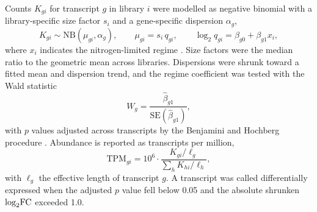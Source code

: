 Counts $K_{gi}$ for transcript $g$ in library $i$ were modelled as negative
binomial with a library-specific size factor $s_i$ and a gene-specific
dispersion $\alpha_g$,
\begin{equation}
  \label{eq:nb}
  K_{gi} \sim \mathrm{NB}\!\left(\mu_{gi}, \alpha_g\right),
  \qquad
  \mu_{gi} = s_i \, q_{gi},
  \qquad
  \log_{2} q_{gi} = \beta_{g0} + \beta_{g1} x_i,
\end{equation}
where $x_i$ indicates the nitrogen-limited regime \citep{love2014deseq2}.
Size factors were the median ratio to the geometric mean across libraries.
Dispersions were shrunk toward a fitted mean and dispersion trend, and the
regime coefficient was tested with the Wald statistic
\begin{equation}
  \label{eq:wald}
  W_g = \frac{\hat{\beta}_{g1}}{\mathrm{SE}(\hat{\beta}_{g1})},
\end{equation}
with $p$ values adjusted across transcripts by the Benjamini and Hochberg
procedure \citep{benjamini1995controlling}. Abundance is reported as transcripts
per million,
\begin{equation}
  \label{eq:tpm}
  \mathrm{TPM}_{gi}
  = 10^{6} \cdot
    \frac{K_{gi} / \ell_{g}}{\sum_{h} K_{hi} / \ell_{h}},
\end{equation}
with $\ell_g$ the effective length of transcript $g$. A transcript was called
differentially expressed when the adjusted $p$ value fell below 0.05 and the
absolute shrunken $\log_{2}\!\text{FC}$ exceeded 1.0.
